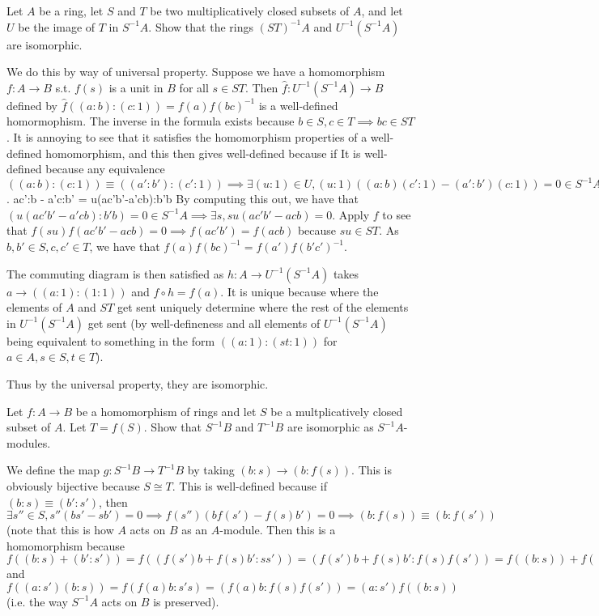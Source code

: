 \documentclass[a4paper]{exam}
\begin{document}
\begin{questions}
\question Let $A$ be a ring, let $S$ and $T$ be two multiplicatively closed subsets of $A $, and let $U$ be the image of $T$ in $S^{-1}A$. Show that the rings $(ST)^{-1}A$ and $U^{-1}(S^{-1}A)$ are isomorphic.
\begin{solution}
	We do this by way of universal property.
	Suppose we have a homomorphism $f:A \to B$ s.t. $f(s)$ is a unit in $B$ for all $s \in ST$.
	Then $\hat{f}: U^{-1}(S^{-1}A) \to B$ defined by $\hat{f}((a:b):(c:1)) = f(a)f(bc)^{-1}$ is a well-defined homormophism.
	The inverse in the formula exists because $b\in S, c\in T \implies bc \in ST$.
	It is annoying to see that it satisfies the homomorphism properties of a well-defined homomorphism, and this then gives well-defined because if
	It is well-defined because any equivalence $((a:b):(c:1)) \equiv ((a':b'):(c':1)) \implies \exists (u:1)\in U, (u:1)((a:b)(c':1)-(a':b')(c:1)) = 0 \in S^{-1}A$.
	ac':b - a'c:b' = u(ac'b'-a'cb):b'b
	By computing this out, we have that $(u(ac'b'-a'cb):b'b) =0 \in S^{-1}A \implies \exists s, su(ac'b'-ac b) = 0$.
	Apply $f$ to see that $f(su)f(ac'b'-ac b) = 0 \implies f(ac'b') = f(ac b)$ because $su \in ST$.
	As $b,b'\in S,c,c'\in T $, we have that $f(a)f(bc)^{-1} = f(a')f(b'c')^{-1}$.

	The commuting diagram is then satisfied as $h: A\to U^{-1}(S^{-1}A)$ takes $a \to ((a:1):(1:1))$ and $f\circ h = f(a)$.
	It is unique because where the elements of $A$ and $ST$ get sent uniquely determine where the rest of the elements in $U^{-1}(S^{-1}A)$ get sent (by well-defineness and all elements of $U^{-1}(S^{-1}A)$ being equivalent to something in the form $((a:1):(st:1))$ for $a\in A, s\in S, t\in T $).

	Thus by the universal property, they are isomorphic.
\end{solution}

\question Let $f: A\to B$ be a homomorphism of rings and let $S$ be a multplicatively closed subset of $A$. Let $T = f(S)$. Show that $S^{-1}B$ and $T^{-1}B$ are isomorphic as $S^{-1}A$-modules.
\begin{solution}
	We define the map $g: S^{-1}B\to T^{-1}B$ by taking $(b:s) \to (b:f(s))$.
	This is obviously bijective because $S\cong T$.
	This is well-defined because if $(b:s) \equiv (b':s') $, then $\exists s''\in S, s''(bs'-sb') = 0 \implies f(s'')(bf(s')-f(s)b') = 0\implies (b:f(s)) \equiv (b:f(s'))$ (note that this is how $A$ acts on $B$ as an $A$-module.
	Then this is a homomorphism because $f((b:s)+(b':s')) = f((f(s')b+f(s)b':ss')) = (f(s')b+f(s)b':f(s)f(s')) = f((b:s)) + f((b':s'))$ and $f((a:s')(b:s)) = f(f(a)b:s's) = (f(a)b:f(s)f(s')) = (a:s')f((b:s)) $ (i.e. the way $S^{-1}A $ acts on $B $ is preserved).


\end{solution}
\end{questions}
\end{document}
